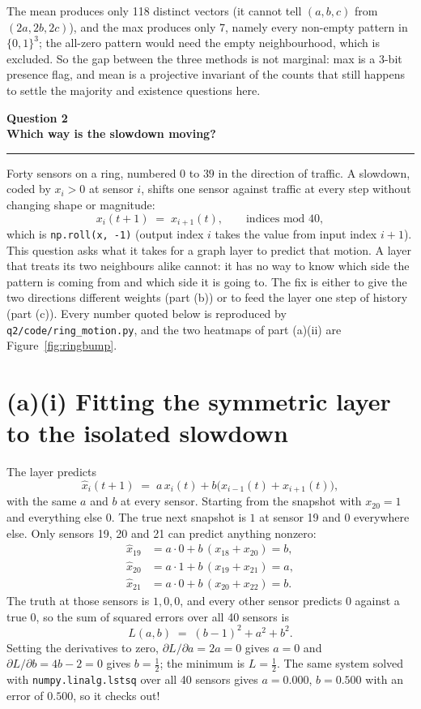 \documentclass[11pt,letterpaper]{article}
\newcommand{\taskbanner}[2]{\begin{center}{\small\bfseries #1}\\[3pt]{\Large\bfseries #2}\end{center}\vspace{2pt}\hrule\vspace{8pt}}
\begin{document}
The mean produces only 118 distinct vectors (it cannot tell $(a,b,c)$
from $(2a, 2b, 2c)$), and the max produces only 7, namely every non-empty pattern in
$\{0,1\}^3$; the all-zero pattern would need the empty neighbourhood, which is excluded. So
the gap between the three methods is not marginal: max is a 3-bit presence flag, and mean is
a projective invariant of the counts that still happens to settle the majority and existence
questions here.

\newpage

\taskbanner{Question 2}{Which way is the slowdown moving?}

Forty sensors on a ring, numbered $0$ to $39$ in the direction of traffic. A slowdown, coded
by $x_i > 0$ at sensor $i$, shifts one sensor against traffic at every step without changing
shape or magnitude:
\begin{equation*}
x_i(t+1) \;=\; x_{i+1}(t), \qquad \text{indices mod } 40,
\end{equation*}
which is \texttt{np.roll(x, -1)} (output index $i$ takes the value from input index
$i+1$). This question asks what it takes for a graph layer to predict that motion. A layer
that treats its two neighbours alike cannot: it has no way to know which side the pattern is
coming from and which side it is going to. The fix is either to give the two directions
different weights (part (b)) or to feed the layer one step of history (part (c)). Every number
quoted below is reproduced by \texttt{q2/code/ring\_motion.py}, and the two heatmaps of part (a)(ii) are
Figure~\ref{fig:ringbump}.

\section*{(a)(i) Fitting the symmetric layer to the isolated slowdown}

The layer predicts
\begin{equation*}
\hat{x}_i(t+1) \;=\; a\, x_i(t) + b\bigl(x_{i-1}(t) + x_{i+1}(t)\bigr),
\end{equation*}
with the same $a$ and $b$ at every sensor. Starting from the snapshot with $x_{20} = 1$ and
everything else $0$. The true next snapshot is $1$ at sensor 19 and $0$ everywhere else. Only
sensors 19, 20 and 21 can predict anything nonzero:
\begin{align*}
\hat{x}_{19} &= a \cdot 0 + b\,(x_{18} + x_{20}) = b, \\
\hat{x}_{20} &= a \cdot 1 + b\,(x_{19} + x_{21}) = a, \\
\hat{x}_{21} &= a \cdot 0 + b\,(x_{20} + x_{22}) = b.
\end{align*}
The truth at those sensors is $1, 0, 0$, and every other sensor predicts $0$ against a true
$0$, so the sum of squared errors over all 40 sensors is
\begin{equation*}
L(a,b) \;=\; (b-1)^2 + a^2 + b^2 .
\end{equation*}
Setting the derivatives to zero, $\partial L / \partial a = 2a = 0$ gives $a = 0$ and
$\partial L / \partial b = 4b - 2 = 0$ gives $b = \tfrac{1}{2}$; the minimum is
$L = \tfrac{1}{2}$. The same system solved with \texttt{numpy.linalg.lstsq} over all 40
sensors gives $a = 0.000$, $b = 0.500$ with an error of $0.500$, so it checks out!
\end{document}
